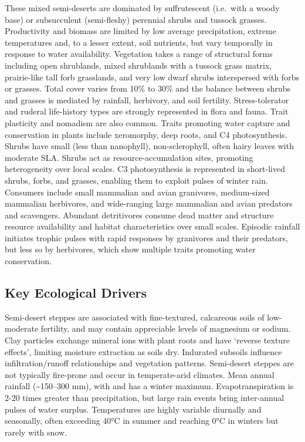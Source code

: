 \documentclass[
  letterpaper,
  DIV=11,
  numbers=noendperiod]{scrartcl}
\begin{document}
These mixed semi-deserts are dominated by suffrutescent (i.e.~with a
woody base) or subsucculent (semi-fleshy) perennial shrubs and tussock
grasses. Productivity and biomass are limited by low average
precipitation, extreme temperatures and, to a lesser extent, soil
nutrients, but vary temporally in response to water availability.
Vegetation takes a range of structural forms including open shrublands,
mixed shrublands with a tussock grass matrix, prairie-like tall forb
grasslands, and very low dwarf shrubs interspersed with forbs or
grasses. Total cover varies from 10\% to 30\% and the balance between
shrubs and grasses is mediated by rainfall, herbivory, and soil
fertility. Stress-tolerator and ruderal life-history types are strongly
represented in flora and fauna. Trait plasticity and nomadism are also
common. Traits promoting water capture and conservation in plants
include xeromorphy, deep roots, and C4 photosynthesis. Shrubs have small
(less than nanophyll), non-sclerophyll, often hairy leaves with moderate
SLA. Shrubs act as resource-accumulation sites, promoting heterogeneity
over local scales. C3 photosynthesis is represented in short-lived
shrubs, forbs, and grasses, enabling them to exploit pulses of winter
rain. Consumers include small mammalian and avian granivores,
medium-sized mammalian herbivores, and wide-ranging large mammalian and
avian predators and scavengers. Abundant detritivores consume dead
matter and structure resource availability and habitat characteristics
over small scales. Episodic rainfall initiates trophic pulses with rapid
responses by granivores and their predators, but less so by herbivores,
which show multiple traits promoting water conservation.

\subsection{Key Ecological Drivers}\label{key-ecological-drivers-88}

Semi-desert steppes are associated with fine-textured, calcareous soils
of low-moderate fertility, and may contain appreciable levels of
magnesium or sodium. Clay particles exchange mineral ions with plant
roots and have `reverse texture effects', limiting moisture extraction
as soils dry. Indurated subsoils influence infiltration/runoff
relationships and vegetation patterns. Semi-desert steppes are not
typically fire-prone and occur in temperate-arid climates. Mean annual
rainfall (\textasciitilde150--300 mm), with and has a winter maximum.
Evapotranspiration is 2-20 times greater than precipitation, but large
rain events bring inter-annual pulses of water surplus. Temperatures are
highly variable diurnally and seasonally, often exceeding 40°C in summer
and reaching 0°C in winters but rarely with snow.
\end{document}
